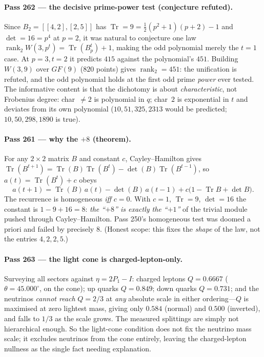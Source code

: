 \documentclass[12pt,a4paper]{article}
\def\mathrm#1{#1}%
\def\mathbf#1{#1}%
\def\textbf#1{#1}%
\theoremstyle{definition}
\begin{document}
\paragraph{Pass 262 --- the decisive prime-power test (conjecture refuted).}
Since $B_2=[[4,2],[2,5]]$ has $\operatorname{Tr}=9=\tfrac12(p^2+1)(p+2)-1$ and
$\det=16=p^4$ at $p=2$, it was natural to conjecture one law
$\operatorname{rank}_2 W(3,p^t)=\operatorname{Tr}(B_p^t)+1$, making the odd
polynomial merely the $t=1$ case. At $p=3,t=2$ it predicts $415$ against the
polynomial's $451$. Building $W(3,9)$ over $\mathrm{GF}(9)$ ($820$ points) gives
$\operatorname{rank}_2=\mathbf{451}$: \textbf{the unification is refuted}, and the
odd polynomial holds at the first odd prime \emph{power} ever tested. The
informative content is that the dichotomy is about \emph{characteristic}, not
Frobenius degree: char~$\neq2$ is polynomial in $q$; char~$2$ is exponential in
$t$ and deviates from its own polynomial ($10,51,325,2313$ would be predicted;
$10,50,298,1890$ is true).

\paragraph{Pass 261 --- why the $+8$ (theorem).} For any $2\times2$ matrix $B$ and
constant $c$, Cayley--Hamilton gives
$\operatorname{Tr}(B^{t+1})=\operatorname{Tr}(B)\operatorname{Tr}(B^t)-\det(B)
\operatorname{Tr}(B^{t-1})$, so $a(t)=\operatorname{Tr}(B^t)+c$ obeys
\[
   a(t+1)=\operatorname{Tr}(B)\,a(t)-\det(B)\,a(t-1)+c\bigl(1-\operatorname{Tr}B+\det B\bigr).
\]
The recurrence is homogeneous \emph{iff} $c=0$. With $c=1$, $\operatorname{Tr}=9$,
$\det=16$ the constant is $1-9+16=8$: \emph{the ``$+8$'' is exactly the ``$+1$''}
of the trivial module pushed through Cayley--Hamilton. Pass 250's homogeneous
test was doomed a priori and failed by precisely $8$. (Honest scope: this fixes
the \emph{shape} of the law, not the entries $4,2,2,5$.)

\paragraph{Pass 263 --- the light cone is charged-lepton-only.} Surveying all
sectors against $\eta=2P_{\mathbf1}-I$: charged leptons $Q=0.6667$
($\theta=45.000^\circ$, on the cone); up quarks $Q=0.849$; down quarks $Q=0.731$;
and the neutrinos \emph{cannot reach} $Q=2/3$ at \emph{any} absolute scale in
either ordering---$Q$ is maximised at zero lightest mass, giving only $0.584$
(normal) and $0.500$ (inverted), and falls to $1/3$ as the scale grows. The
measured splittings are simply not hierarchical enough. So the light-cone
condition does not fix the neutrino mass scale; it excludes neutrinos from the
cone entirely, leaving the charged-lepton nullness as the single fact needing
explanation.
\end{document}
